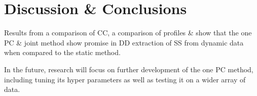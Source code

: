 \section{Discussion \& Conclusions} \label{sec:discussion_and_conclusions}
    Results from a comparison of \gls{CC}, a comparison of profiles \&  show that the one \gls{PC} \& joint method show promise in \gls{DD} extraction of \gls{SS} from dynamic data when compared to the static method.
    
    In the future, research will focus on further development of the one \gls{PC} method, including tuning its hyper parameters as well as testing it on a wider array of data.
